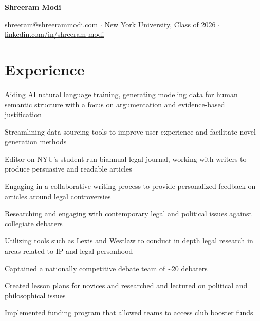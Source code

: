 \documentclass[letterpaper]{resume-shreeram}
\begin{document}
\begin{center}
  {\Huge \bfseries Shreeram Modi}

  \href{mailto:shreeram@shreerammodi.com}{shreeram@shreerammodi.com}
  $\cdot$
  New York University, Class of 2026
  $\cdot$
  \href{https://linkedin.com/in/shreeram-modi}{linkedin.com/in/shreeram-modi}
\end{center}

\section{Experience}

\begin{compactitem}
  \item Aiding AI natural language training, generating modeling data for human semantic structure with a focus on argumentation and evidence-based justification

  \item Streamlining data sourcing tools to improve user experience and
  facilitate novel generation methods
\end{compactitem}

\begin{compactitem}
  \item Editor on NYU's student-run biannual legal journal, working with
  writers to produce persuasive and readable articles

  \item Engaging in a collaborative writing process to provide personalized feedback on articles around legal controversies
\end{compactitem}

\begin{compactitem}
  \item Researching and engaging with contemporary legal and political
  issues against collegiate debaters

  \item Utilizing tools such as Lexis and Westlaw to conduct in depth
  legal research in areas related to IP and legal personhood
\end{compactitem}

\begin{compactitem}
  \item Captained a nationally competitive debate team of
  \textasciitilde{}20 debaters

  \item Created lesson plans for novices and researched and lectured on
  political and philosophical issues

  \item Implemented funding program that allowed teams to access club
  booster funds
\end{compactitem}
\end{document}
